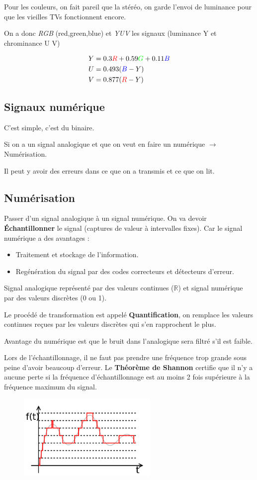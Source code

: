 			Pour les couleurs, on fait pareil que la stéréo, on garde l'envoi de luminance pour que les vieilles TVs fonctionnent encore.
			
			On a donc \textit{RGB} (red,green,blue) et \textit{YUV} les signaux (luminance Y et chrominance U V)
			
			\begin{align*} 
				Y &= 0.3\textcolor{red}{R} + 0.59\textcolor{green}{G} + 0.11\textcolor{blue}{B}\\
				U &= 0.493(\textcolor{blue}{B}-Y)\\
				V &= 0.877(\textcolor{red}{R}-Y)
			\end{align*}
	\subsection{Signaux numérique}
		C'est simple, c'est du binaire.
		
		Si on a un signal analogique et que on veut en faire un numérique $\rightarrow$ Numérisation.
		
		Il peut y avoir des erreurs dans ce que on a transmis et ce que on lit.
		
	\subsection{Numérisation}
		Passer d'un signal analogique à un signal numérique. On va devoir \textbf{Échantillonner} le signal (captures de valeur à intervalles fixes). Car le signal numérique a des avantages :
		\begin{itemize}
			\item Traitement et stockage de l'information.
			\item Regénération du signal par des codes correcteurs et détecteurs d'erreur.
		\end{itemize}
		
		Signal analogique représenté par des valeurs continues ($\mathbb{R}$) et signal numérique par des valeurs discrètes (0 ou 1).
		
		Le procédé de transformation est appelé \textbf{Quantification}, on remplace les valeurs continues reçues par les valeurs discrètes qui s'en rapprochent le plus.
		
		Avantage du numérique est que le bruit dans l'analogique sera filtré s'il est faible.
		
		Lors de l'échantillonnage, il ne faut pas prendre une fréquence trop grande sous peine d'avoir beaucoup d'erreur. Le \textbf{Théorème de Shannon} certifie que il n'y a aucune perte si la fréquence d'échantillonnage est au moins 2 fois supérieure à la fréquence maximum du signal.
		
		\begin{figure}[H]
			\centering
			\includegraphics[width=0.6\textwidth]{img/Quantification.png}
		\end{figure}		
		
		
		